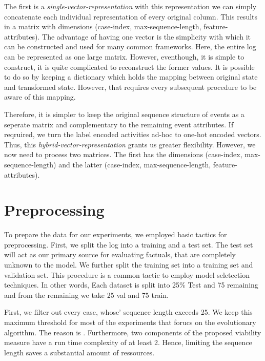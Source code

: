 \documentclass[./../../paper.tex]{subfiles}
\begin{document}
The first is a \emph{single-vector-representation} with this representation we can simply concatenate each individual representation of every original column. This results in a matrix with dimensions (case-index, max-sequence-length, feature-attributes). The advantage of having one vector is the simplicity with which it can be constructed and used for many common frameworks. Here, the entire log can be represented as one large matrix. However, eventhough, it is simple to construct, it is quite complicated to reconstruct the former values. It is possible to do so by keeping a dictionary which holds the mapping between original state and transformed state. However, that requires every subsequent procedure to be aware of this mapping.

Therefore, it is simpler to keep the original sequence structure of events as a seperate matrix and complementary to the remaining event attributes. If reqruired, we turn the label encoded activities ad-hoc to one-hot encoded vectors. Thus, this \emph{hybrid-vector-representation} grants us greater flexibility. However, we now need to process two matrices. The first has the dimensions (case-index, max-sequence-length) and the latter (case-index, max-sequence-length, feature-attributes). 

\section{Preprocessing}
\label{sec:preprocessing}

To prepare the data for our experiments, we employed basic tactics for preprocessing. First, we split the log into a training and a test set. The test set will act as our primary source for evaluating factuals, that are completely unknown to the model. We further split the training set into a training set and validation set. This procedure is a common tactic to employ model seletection techniques.  In other words, Each dataset is split into 25\% Test and 75 remaining and from the remaining we take 25 val and 75 train.

First, we filter out every case, whose' sequence length exceeds 25.  We keep this maximum threshold for most of the experiments that forucs on the evolutionary algorithm. The reason is . Furthermore, two components of the proposed viability measure have a run time complexity of at least 2. Hence, limiting the sequence length saves a substantial amount of ressources.
\end{document}

